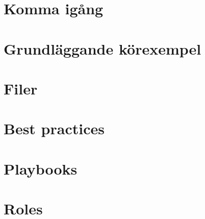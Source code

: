 \pagestyle{plain}

\setcounter{page}{1}
\chapter{Komma igång}\label{sec:intro}


\chapter{Grundläggande körexempel}\label{sec:basicexamples}


\chapter{Filer}\label{sec:files}


\chapter{Best practices}\label{sec:bestpractices}


\chapter{Playbooks}\label{sec:playbooks}


\chapter{Roles}\label{sec:roles}

